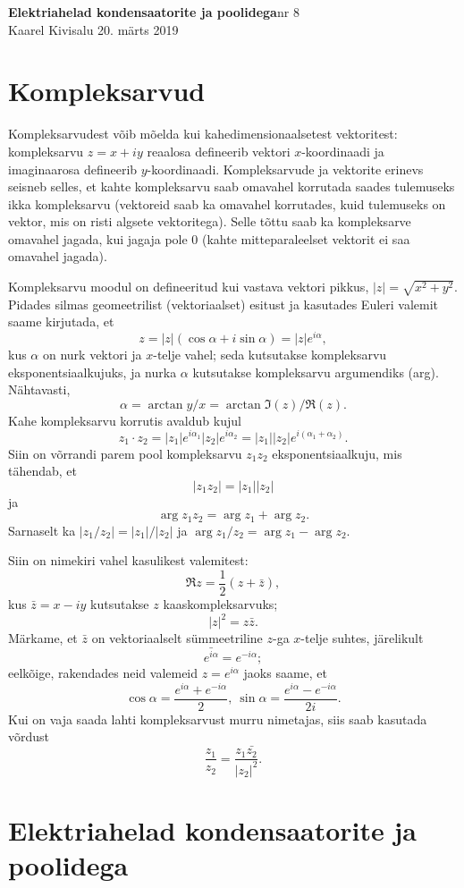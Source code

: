 \documentclass[a4paper,11pt,twocolumn]{article}
\newcommand*\conj[1]{\bar{#1}}
\begin{document}
{\huge \textbf{Elektriahelad kondensaatorite ja poolidega}\hfill \normalsize{nr 8}} \\
{Kaarel Kivisalu \hfill 20. märts 2019}

\section{Kompleksarvud}
Kompleksarvudest võib mõelda kui kahedimensionaalsetest vektoritest: kompleksarvu \(z = x + iy\) reaalosa defineerib vektori \(x\)-koordinaadi ja imaginaarosa defineerib \(y\)-koordinaadi. Kompleksarvude ja vektorite erinevs seisneb selles, et kahte kompleksarvu saab omavahel korrutada saades tulemuseks ikka kompleksarvu (vektoreid saab ka omavahel korrutades, kuid tulemuseks on vektor, mis on risti algsete vektoritega). Selle tõttu saab ka kompleksarve omavahel jagada, kui jagaja pole \num{0} (kahte mitteparaleelset vektorit ei saa omavahel jagada).

Kompleksarvu moodul on defineeritud kui vastava vektori pikkus, \(|z|=\sqrt{x^2+y^2}\). Pidades silmas geomeetrilist (vektoriaalset) esitust ja kasutades Euleri valemit saame kirjutada, et
\[z=|z|(\cos \alpha + i \sin \alpha)=|z|e^{i\alpha},\]
kus \(\alpha\) on nurk vektori ja \(x\)-telje vahel; seda kutsutakse kompleksarvu eksponentsiaalkujuks, ja nurka \(\alpha\) kutsutakse kompleksarvu argumendiks (arg). Nähtavasti,
\[\alpha = \arctan y/x=\arctan \Im(z)/\Re(z).\]
Kahe kompleksarvu korrutis avaldub kujul
\[z_1 \cdot z_2 = |z_1|e^{i\alpha_1}|z_2|e^{i\alpha_2}=|z_1||z_2|e^{i(\alpha_1+\alpha_2)}.\]
Siin on võrrandi parem pool kompleksarvu \(z_1 z_2\) eksponentsiaalkuju, mis tähendab, et
\[|z_1 z_2| = |z_1||z_2|\]
ja
\[\arg z_1z_2=\arg z_1 + \arg z_2.\]
Sarnaselt ka \(|z_1/z_2|=|z_1|/|z_2|\) ja \(\arg z_1/z_2=\arg z_1-\arg z_2\).

Siin on nimekiri vahel kasulikest valemitest:
\[\Re{z}=\frac{1}{2}(z+\conj{z}),\]
kus \(\conj{z}=x-iy\) kutsutakse \(z\) kaaskompleksarvuks;
\[|z|^2=z\conj{z}.\]
Märkame, et \(\conj{z}\) on vektoriaalselt sümmeetriline \(z\)-ga \(x\)-telje suhtes, järelikult
\[\conj{e^{i\alpha}}=e^{-i\alpha};\]
eelkõige, rakendades neid valemeid \(z=e^{i\alpha}\) jaoks saame, et
\[\cos \alpha = \frac{e^{i\alpha}+ e^{-i\alpha}}{2},\ \sin \alpha = \frac{e^{i\alpha}-e^{-i\alpha}}{2i}.\]
Kui on vaja saada lahti kompleksarvust murru nimetajas, siis saab kasutada võrdust
\[\frac{z_1}{z_2}=\frac{z_1 \conj{z_2}}{|z_2|^2}.\]

\section{Elektriahelad kondensaatorite ja poolidega}
\end{document}
